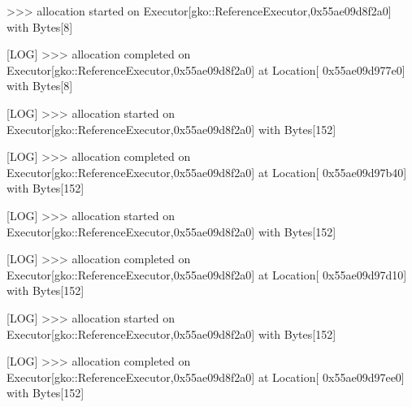 \begin{DoxyCode}
[LOG] >>> allocation started on Executor[gko::ReferenceExecutor,0x55ae09d8f2a0] with Bytes[8]              
                                                                                                                  
                                                               
[LOG] >>> allocation completed on Executor[gko::ReferenceExecutor,0x55ae09d8f2a0] at Location[
      0x55ae09d977e0] with Bytes[8]                                                                                            
                                                               
[LOG] >>> allocation started on Executor[gko::ReferenceExecutor,0x55ae09d8f2a0] with Bytes[152]            
                                                                                                                  
                                                               
[LOG] >>> allocation completed on Executor[gko::ReferenceExecutor,0x55ae09d8f2a0] at Location[
      0x55ae09d97b40] with Bytes[152]                                                                                          
                                                               
[LOG] >>> allocation started on Executor[gko::ReferenceExecutor,0x55ae09d8f2a0] with Bytes[152]            
                                                                                                                  
                                                               
[LOG] >>> allocation completed on Executor[gko::ReferenceExecutor,0x55ae09d8f2a0] at Location[
      0x55ae09d97d10] with Bytes[152]                                                                                          
                                                               
[LOG] >>> allocation started on Executor[gko::ReferenceExecutor,0x55ae09d8f2a0] with Bytes[152]            
                                                                                                                  
                                                               
[LOG] >>> allocation completed on Executor[gko::ReferenceExecutor,0x55ae09d8f2a0] at Location[
      0x55ae09d97ee0] with Bytes[152]                                                                                          
                                                               

\end{DoxyCode}
